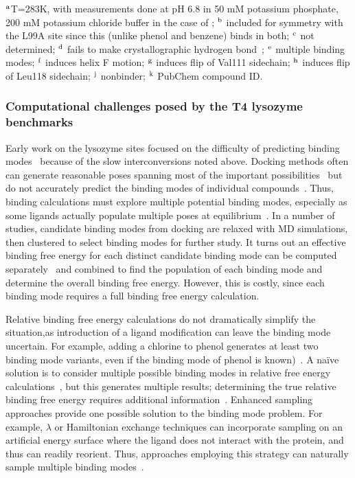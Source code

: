 \documentclass[aps,pre,twocolumn,nofootinbib,superscriptaddress,10pt, final,tightenlines]{revtex4-1}
\begin{document}
\begin{table}
\begin{center}
\end{center}
$^{\rm a}$T=283K, with measurements done at pH 6.8 in 50 mM potassium phosphate, 200 mM potassium chloride buffer in the case of \cite{boyce_predicting_2009}; $^{\rm b}$ included for symmetry with the L99A site since this (unlike phenol and benzene) binds in both; $^{\rm c}$ not determined; $^{\rm d}$ fails to make crystallographic hydrogen bond~\cite{boyce_predicting_2009}; $^{\rm e}$ multiple binding modes; $^{\rm f}$ induces helix F motion; $^{\rm g}$ induces flip of Val111 sidechain; $^{\rm h}$ induces flip of Leu118 sidechain; $^{\rm j}$ nonbinder; $^{\rm k}$ PubChem compound ID.
\end{table}
\endgroup


\subsubsection{Computational challenges posed by the T4 lysozyme benchmarks}
Early work on the lysozyme sites focused on the difficulty of predicting binding modes~\cite{mobley_use_2006, mobley_predicting_2007, boyce_predicting_2009} because of the slow interconversions noted above. 
Docking methods often can generate reasonable poses spanning most of the important possibilities~\cite{mobley_use_2006, mobley_predicting_2007, boyce_predicting_2009, graves_rescoring_2008} but do not accurately predict the binding modes of individual compounds~\cite{mobley_predicting_2007, boyce_predicting_2009, graves_rescoring_2008}. 
Thus, binding calculations must explore multiple potential binding modes, especially as some ligands actually populate multiple poses at equilibrium~\cite{boyce_predicting_2009}. 
In a number of studies, candidate binding modes from docking are relaxed with MD simulations, then clustered to select binding modes for further study. 
It turns out an effective binding free energy for each distinct candidate binding mode can be computed separately~\cite{mobley_use_2006} and combined to find the population of each binding mode and determine the overall binding free energy.
However, this is costly, since each binding mode requires a full binding free energy calculation.

Relative binding free energy calculations do not dramatically simplify the situation,as
introduction of a ligand modification can leave the binding mode uncertain. 
For example, adding a chlorine to phenol generates at least two binding mode variants, even if the binding mode of phenol is known)~\cite{boyce_predicting_2009}. 
A na{\" i}ve solution is to consider multiple possible binding modes in relative free energy calculations~\cite{boyce_predicting_2009}, but this generates multiple results; determining the true relative binding free energy requires additional information~\cite{mobley_perspective_2012}. 
Enhanced sampling approaches provide one possible solution to the binding mode problem. 
For example, $\lambda$ or Hamiltonian exchange techniques can incorporate sampling on an artificial energy surface where the ligand does not interact with the protein, and thus can readily reorient.
Thus, approaches employing this strategy can naturally sample multiple binding modes~\cite{gallicchio_binding_2010, wang_identifying_2013}.
\end{document}
